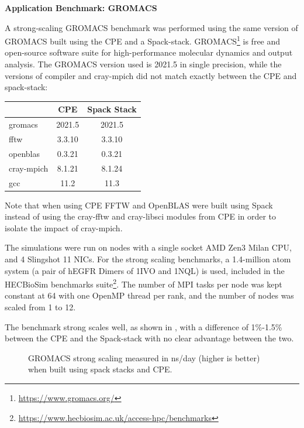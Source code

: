 \noindent\textbf{Application Benchmark: GROMACS}

A strong-scaling GROMACS benchmark was performed using the same version of GROMACS built using the CPE and a Spack-stack.
GROMACS\footnote{\url{https://www.gromacs.org/}} is free and open-source software suite for high-performance molecular dynamics and output analysis.
The GROMACS version used is 2021.5 in single precision, while the versions of compiler and cray-mpich did not match exactly between the CPE and spack-stack:
\begin{center}
    \begin{tabular}{l |c  c }
                      & CPE   & Spack Stack \\
          \hline
        gromacs       & 2021.5   & 2021.5   \\
        fftw          & 3.3.10   & 3.3.10   \\
        openblas      & 0.3.21   & 0.3.21   \\
        cray-mpich    & 8.1.21   & 8.1.24   \\
        gcc           & 11.2     & 11.3     \\
    \end{tabular}
\end{center}
Note that when using CPE FFTW and OpenBLAS were built using Spack instead of using the cray-fftw and cray-libsci modules from CPE in order to isolate the impact of cray-mpich.

The simulations were run on nodes with a single socket AMD Zen3 Milan CPU, and 4 Slingshot 11 NICs.
For the strong scaling benchmarks, a 1.4-million atom system (a pair of hEGFR Dimers of 1IVO and 1NQL) is used, included in the HECBioSim benchmarks suite\footnote{\url{https://www.hecbiosim.ac.uk/access-hpc/benchmarks}}.
The number of MPI tasks per node was kept constant at 64 with one OpenMP thread per rank, and the number of nodes was scaled from 1 to 12.

The benchmark strong scales well, as shown in , with a difference of 1\%-1.5\% between the CPE and the Spack-stack with no clear advantage between the two.

\begin{figure}[hp!]
    \begin{center}
        
    \end{center}
    \caption{GROMACS strong scaling measured in ns/day (higher is better) when built using spack stacks and CPE.}
    \label{fig:gromacs-strong}
\end{figure}

